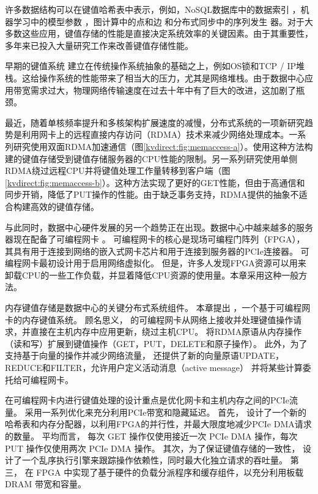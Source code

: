 许多数据结构可以在键值哈希表中表示，例如，NoSQL数据库中的数据索引 \cite {chang2008bigtable}，机器学习中的模型参数 \cite {li2014scaling}，图计算中的点和边 \cite {shao2013trinity,xiao17tux2} 和分布式同步中的序列发生 器\cite {kalia2016design}。对于大多数这些应用，键值存储的性能是直接决定系统效率的关键因素。由于其重要性，多年来已投入大量研究工作来改善键值存储性能。

早期的键值系统\cite {decandia2007dynamo,fitzpatrick2004distributed,nishtala2013scaling} 建立在传统操作系统抽象的基础之上，例如OS锁和TCP / IP堆栈。这给操作系统的性能带来了相当大的压力，尤其是网络堆栈。由于数据中心应用带宽需求过大，物理网络传输速度在过去十年中有了巨大的改进，这加剧了瓶颈。

最近，随着单核频率提升和多核架构扩展速度的减慢，分布式系统的一项新研究趋势是利用网卡上的远程直接内存访问（RDMA）技术来减少网络处理成本。一系列研究\cite {kalia2014using,kalia2016design}使用双面RDMA加速通信（图\ref {kvdirect:fig:memaccess-a}）。使用这种方法构建的键值存储受到键值存储服务器的CPU性能的限制。另一系列研究使用单侧RDMA绕过远程CPU并将键值处理工作量转移到客户端\cite {dragojevic2014farm,mitchell2013using}（图\ref {kvdirect:fig:memaccess-b}）。这种方法实现了更好的GET性能，但由于高通信和同步开销，降低了PUT操作的性能。由于缺乏事务支持，RDMA提供的抽象不适合构建高效的键值存储。

与此同时，数据中心硬件发展的另一个趋势正在出现。数据中心中越来越多的服务器现在配备了可编程网卡 \cite{caulfield2016cloud,greenberg2015sdn,putnam2014reconfigurable}。
可编程网卡的核心是现场可编程门阵列（FPGA），其具有用于连接到网络的嵌入式网卡芯片和用于连接到服务器的PCIe连接器。
可编程网卡最初设计用于启用网络虚拟化\cite {vfp,li2016clicknp}。
但是，许多人发现FPGA资源可以用来卸载CPU的一些工作负载，并显着降低CPU资源的使用量\cite {ouyang14hotchips,MaZC17fpga,huang16socc,cong16dac}。本章采用这种一般方法。
\fi

内存键值存储是数据中心的关键分布式系统组件。
本章提出 \oursys{}，一个基于可编程网卡的内存键值系统。
顾名思义，\oursys{} 的可编程网卡从网络上接收并处理键值操作请求，并直接在主机内存中应用更新，绕过主机CPU。
\oursys{} 将RDMA原语从内存操作（读和写）扩展到键值操作（GET，PUT，DELETE和原子操作）。
此外，为了支持基于向量的操作并减少网络流量，\oursys{} 还提供了新的向量原语UPDATE，REDUCE和FILTER，允许用户定义活动消息（active message）\cite {eicken1992active} 并将某些计算委托给可编程网卡。

在可编程网卡内进行键值处理的设计重点是优化网卡和主机内存之间的PCIe流量。
\oursys{} 采用一系列优化来充分利用PCIe带宽和隐藏延迟。
首先，\oursys{} 设计了一个新的哈希表和内存分配器，以利用FPGA的并行性，并最大限度地减少PCIe DMA请求的数量。
平均而言，\oursys{} 每次 GET 操作仅使用接近一次 PCIe DMA 操作，每次 PUT 操作仅使用两次 PCIe DMA 操作。
其次，为了保证键值存储的一致性，\oursys{} 设计了一个乱序执行引擎来跟踪操作依赖性，同时最大化独立请求的吞吐量。
第三，\oursys{} 在 FPGA 中实现了基于硬件的负载分派程序和缓存组件，以充分利用板载 DRAM 带宽和容量。

